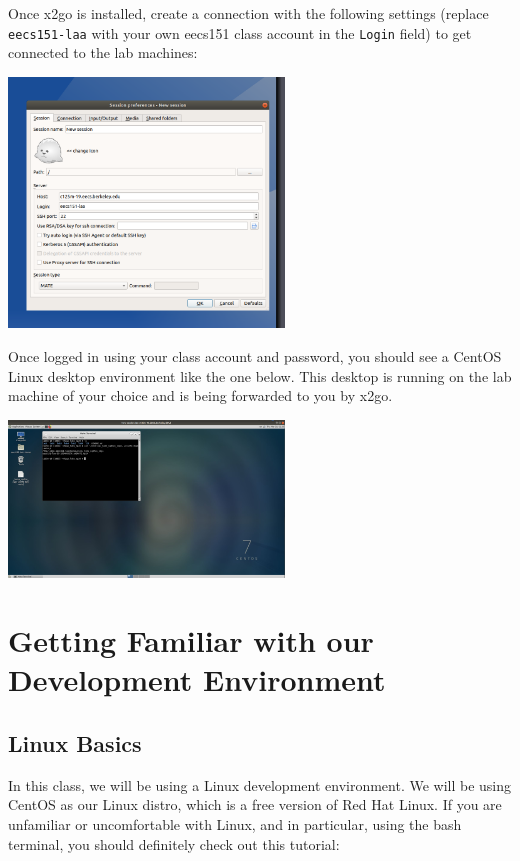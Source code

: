 \documentclass[11pt]{article}
\begin{document}
Once x2go is installed, create a connection with the following settings (replace \texttt{eecs151-laa} with your own eecs151 class account in the \texttt{Login} field) to get connected to the lab machines:

\begin{center}
\includegraphics[width=0.55\textwidth]{figs/x2go_setup.png}
\end{center}

Once logged in using your class account and password, you should see a CentOS Linux desktop environment like the one below. This desktop is running on the lab machine of your choice and is being forwarded to you by x2go.

\begin{center}
\includegraphics[width=0.55\textwidth]{figs/x2go_desktop.png}
\end{center}


\section{Getting Familiar with our Development Environment}
\subsection{Linux Basics}
In this class, we will be using a Linux development environment. We will be using CentOS as our Linux distro, which is a free version of Red Hat Linux. If you are unfamiliar or uncomfortable with Linux, and in particular, using the bash terminal, you should definitely check out this tutorial:
\end{document}
